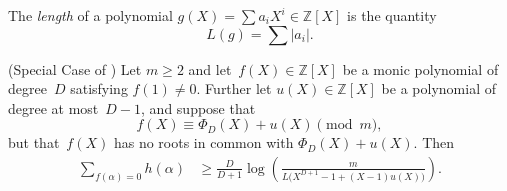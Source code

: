 \begin{definition}
The \emph{length} of a polynomial $g(X)=\sum a_iX^i\in{\mathbb{Z}}[X]$ is the
quantity
\[
  L(g) = \sum |a_i|.
\]
\end{definition}

\begin{theorem}
\label{thm:othercongruences}
\textup{(Special Case of \cite[Corollary~5.3]{MR2313990})}
Let $m\ge2$ and let~$f(X)\in{\mathbb{Z}}[X]$ be a monic polynomial of
degree~$D$ satisfying $f(1)\ne0$. Further let $u(X)\in{\mathbb{Z}}[X]$
be a polynomial of degree at most~$D-1$, and suppose that
\[
  f(X)\equiv {\Phi}_D(X) + u(X) \pmod{m},
\]
but that~$f(X)$ has no roots in common with ${\Phi}_D(X)+u(X)$. Then
\begin{align*}
  \sum_{f({\alpha})=0} h({\alpha}) 
  &\ge \frac{D}{D+1}
            \log\left(\frac{m}{L\bigl(X^{D+1}-1+(X-1)u(X)\bigr)}\right).
\end{align*}
\end{theorem}

